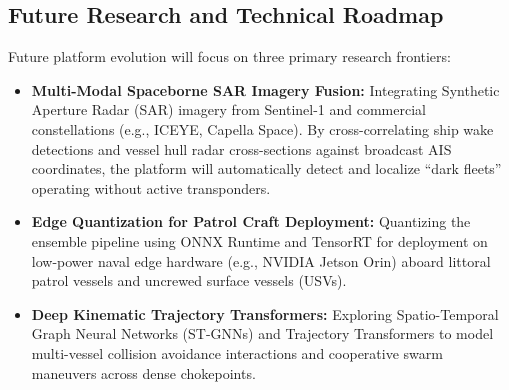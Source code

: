 \subsection{Future Research and Technical Roadmap}
Future platform evolution will focus on three primary research frontiers:
\begin{itemize}[leftmargin=*]
    \item \textbf{Multi-Modal Spaceborne SAR Imagery Fusion:} Integrating Synthetic Aperture Radar (SAR) imagery from Sentinel-1 and commercial constellations (e.g., ICEYE, Capella Space). By cross-correlating ship wake detections and vessel hull radar cross-sections against broadcast AIS coordinates, the platform will automatically detect and localize ``dark fleets'' operating without active transponders.
    \item \textbf{Edge Quantization for Patrol Craft Deployment:} Quantizing the ensemble pipeline using ONNX Runtime and TensorRT for deployment on low-power naval edge hardware (e.g., NVIDIA Jetson Orin) aboard littoral patrol vessels and uncrewed surface vessels (USVs).
    \item \textbf{Deep Kinematic Trajectory Transformers:} Exploring Spatio-Temporal Graph Neural Networks (ST-GNNs) and Trajectory Transformers to model multi-vessel collision avoidance interactions and cooperative swarm maneuvers across dense chokepoints.
\end{itemize}
